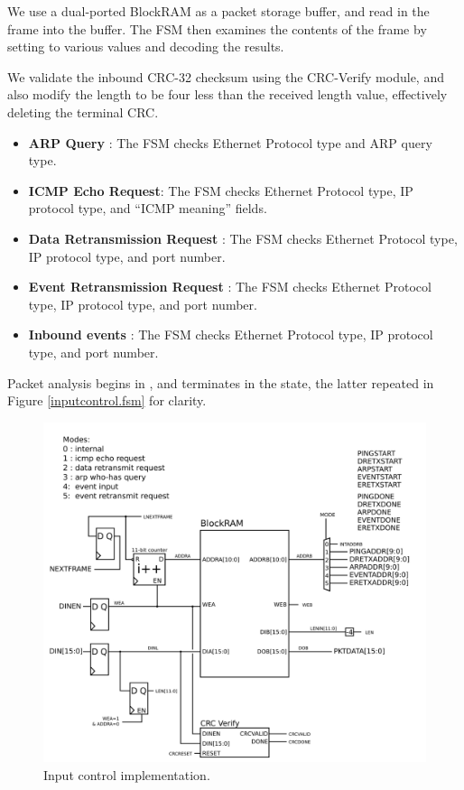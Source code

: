 We use a dual-ported BlockRAM as a packet storage buffer, and read in
the frame into the buffer. The FSM then examines the contents of the
frame by setting  to various values and decoding the
results. 

We validate the inbound CRC-32 checksum using the CRC-Verify module,
and also modify the length to be four less than the received length
value, effectively deleting the terminal CRC. 

\begin{itemize}
\item \textbf{ARP Query} : The FSM checks Ethernet Protocol type and
  ARP query type.
\item \textbf{ICMP Echo Request}: The FSM checks Ethernet Protocol
  type, IP protocol type, and ``ICMP meaning'' fields.
\item \textbf{Data Retransmission Request} : The FSM checks Ethernet
  Protocol type, IP protocol type, and port number.
\item \textbf{Event Retransmission Request} : The FSM checks Ethernet
  Protocol type, IP protocol type, and port number.
\item \textbf{Inbound events} : The FSM checks Ethernet Protocol type,
  IP protocol type, and port number.
\end{itemize}

Packet analysis begins in , and terminates in the
 state, the latter repeated in Figure
\ref{inputcontrol.fsm} for clarity.

\begin{figure}
\begin{centering}
\includegraphics[scale=0.8]{inputcontrol.svg}
\end{centering}
\caption{Input control implementation.}
\label{inputcontrol}
\end{figure}

